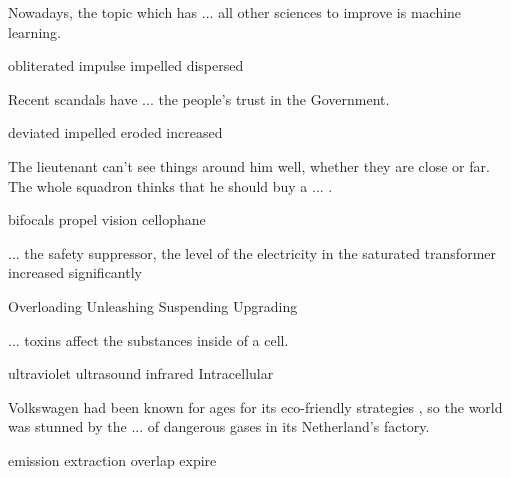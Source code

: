 \documentclass{exam}
\begin{document}
\begin{questions}
\question Nowadays, the topic which has ... all other sciences to improve is machine learning.\\
\begin{oneparchoices}
 
 \choice obliterated
 \choice impulse
\correctchoice impelled
 \choice dispersed
\end{oneparchoices}


\question Recent scandals have ... the people's trust in the Government.\\
\begin{oneparchoices}
 \choice deviated
 \choice impelled
 \correctchoice  eroded
 \choice increased
\end{oneparchoices}


\question The lieutenant can't see things around him well, whether they are close or far. The whole squadron thinks that he should buy a ... .\\
\begin{oneparchoices}
 \correctchoice bifocals
 \choice propel
 \choice vision
 \choice cellophane
\end{oneparchoices}



\question ... the safety suppressor, the level of the electricity in the saturated transformer increased significantly\\
\begin{oneparchoices}
\choice Overloading
 \correctchoice Unleashing
 \choice Suspending
 \choice Upgrading
\end{oneparchoices}

\question ... toxins affect the substances inside of a cell.\\
\begin{oneparchoices}
\choice ultraviolet
\choice ultrasound
\choice infrared
\correctchoice Intracellular
\end{oneparchoices}
\question  Volkswagen had been known for ages for its eco-friendly strategies , so the world was stunned by the ... of dangerous gases in its Netherland's factory.\\
\begin{oneparchoices}
\correctchoice emission
\choice extraction
\choice overlap
\choice expire
\end{oneparchoices}




\end{questions}
\end{document}
